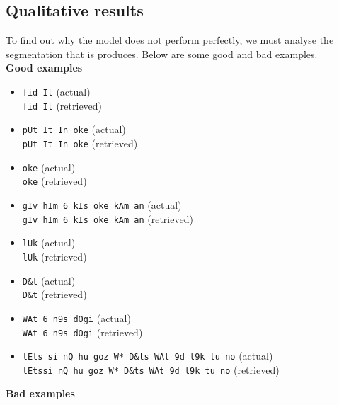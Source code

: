 \begin{multicols}{2}


\subsection{Qualitative results}

To find out why the model does not perform perfectly, we must analyse the segmentation that is produces. Below are some good and bad examples.\\


\noindent\textbf{Good examples}

\begin{itemize}
\item \texttt{fid It} (actual)\\ \texttt{fid It} (retrieved)
\item \texttt{pUt It In oke} (actual)\\ \texttt{pUt It In oke} (retrieved)
\item \texttt{oke} (actual)\\ \texttt{oke} (retrieved)
\item \texttt{gIv hIm 6 kIs oke kAm an} (actual)\\ \texttt{gIv hIm 6 kIs oke kAm an} (retrieved)
\item \texttt{lUk} (actual)\\ \texttt{lUk} (retrieved)
\item \texttt{D\&t} (actual)\\ \texttt{D\&t} (retrieved)
\item \texttt{WAt 6 n9s dOgi} (actual)\\ \texttt{WAt 6 n9s dOgi} (retrieved)
\item \texttt{lEts si nQ hu goz W* D\&ts WAt 9d l9k tu no} (actual)\\ \texttt{lEtssi nQ hu goz W* D\&ts WAt 9d l9k tu no} (retrieved)
\end{itemize}
\vfill
\noindent\textbf{Bad examples}


\end{multicols}
